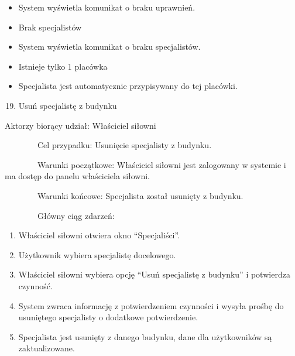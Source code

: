 \documentclass[
]{article}
\providecommand{\tightlist}{%
  \setlength{\itemsep}{0pt}\setlength{\parskip}{0pt}}
\begin{document}
\begin{itemize}
\tightlist
\item
  {System wyświetla komunikat o braku uprawnień.}
\end{itemize}

\begin{itemize}
\tightlist
\item
  {Brak specjalistów}
\end{itemize}

\begin{itemize}
\tightlist
\item
  {System wyświetla komunikat o braku specjalistów.}
\end{itemize}

{}

{}

\begin{itemize}
\tightlist
\item
  {Istnieje tylko 1 placówka }
\end{itemize}

\begin{itemize}
\tightlist
\item
  {Specjalista jest automatycznie przypisywany do tej placówki.\\
  }
\end{itemize}

\begin{enumerate}
\setcounter{enumi}{18}
\tightlist
\item
  {Usuń specjalistę z budynku}
\end{enumerate}

{Aktorzy biorący udział: Właściciel siłowni}

{~~~~~~~~Cel przypadku: Usunięcie specjalisty z budynku.}

{~~~~~~~~Warunki początkowe: Właściciel siłowni jest zalogowany w
systemie i ma dostęp do panelu właściciela siłowni.}

{~~~~~~~~Warunki końcowe: Specjalista został usunięty z budynku.}

{~~~~~~~~Główny ciąg zdarzeń:}

\begin{enumerate}
\tightlist
\item
  {Właściciel siłowni otwiera okno ``Specjaliści''.}
\item
  {Użytkownik wybiera specjalistę docelowego.}
\item
  {Właściciel siłowni wybiera opcję ``Usuń specjalistę z budynku'' i
  potwierdza czynność.}
\item
  {System zwraca informację z potwierdzeniem czynności i wysyła prośbę
  do usuniętego specjalisty o dodatkowe potwierdzenie.}
\item
  {Specjalista jest usunięty z danego budynku, dane dla użytkowników są
  zaktualizowane.}
\end{enumerate}
\end{document}
